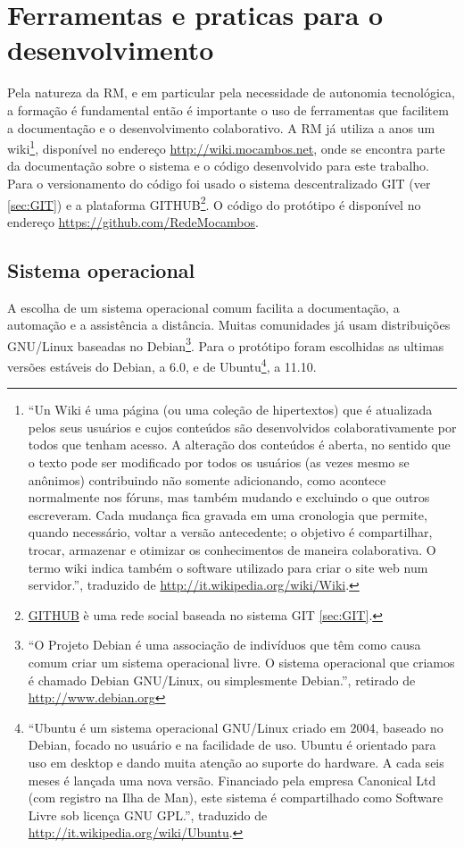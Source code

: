 \section{Ferramentas e praticas para o desenvolvimento}
Pela natureza da RM, e em particular pela necessidade de autonomia
tecnológica, a formação é fundamental então é importante o uso de
ferramentas que facilitem a documentação e o desenvolvimento
colaborativo. A RM já utiliza a anos um wiki\footnote{``Un Wiki é uma
  página (ou uma coleção de hipertextos) que é atualizada pelos seus
  usuários e cujos conteúdos são desenvolvidos colaborativamente por
  todos que tenham acesso. A alteração dos conteúdos é aberta, no
  sentido que o texto pode ser modificado por todos os usuários (as
  vezes mesmo se anônimos) contribuindo não somente adicionando, como
  acontece normalmente nos fóruns, mas também mudando e excluindo o
  que outros escreveram. Cada mudança fica gravada em uma cronologia
  que permite, quando necessário, voltar a versão antecedente; o
  objetivo é compartilhar, trocar, armazenar e otimizar os
  conhecimentos de maneira colaborativa. O termo wiki indica também o
  software utilizado para criar o site web num servidor.'', traduzido
  de \url{http://it.wikipedia.org/wiki/Wiki}.}, disponível no endereço
\url{http://wiki.mocambos.net}, onde se encontra parte da documentação
sobre o sistema e o código desenvolvido para este trabalho. Para o
versionamento do código foi usado o sistema descentralizado GIT (ver
\ref{sec:GIT}) e a plataforma
GITHUB\footnote{\href{http://github.com}{GITHUB} è uma rede social
  baseada no sistema GIT \ref{sec:GIT}.}. O código do protótipo é
disponível no endereço \url{https://github.com/RedeMocambos}.

\subsection{Sistema operacional}
A escolha de um sistema operacional comum facilita a documentação, a
automação e a assistência a distância. Muitas comunidades já usam
distribuições GNU/Linux baseadas no Debian\footnote{``O Projeto Debian
  é uma associação de indivíduos que têm como causa comum criar um
  sistema operacional livre. O sistema operacional que criamos é
  chamado Debian GNU/Linux, ou simplesmente Debian.'', retirado de
  \url{http://www.debian.org}}. Para o protótipo foram escolhidas as
ultimas versões estáveis do Debian, a 6.0, e de
Ubuntu\footnote{``Ubuntu é um sistema operacional GNU/Linux criado em
  2004, baseado no Debian, focado no usuário e na facilidade de
  uso. Ubuntu é orientado para uso em desktop e dando muita atenção ao
  suporte do hardware. A cada seis meses é lançada uma nova
  versão. Financiado pela empresa Canonical Ltd (com registro na Ilha
  de Man), este sistema é compartilhado como Software Livre sob
  licença GNU GPL.'', traduzido de
  \url{http://it.wikipedia.org/wiki/Ubuntu}.}, a 11.10.

